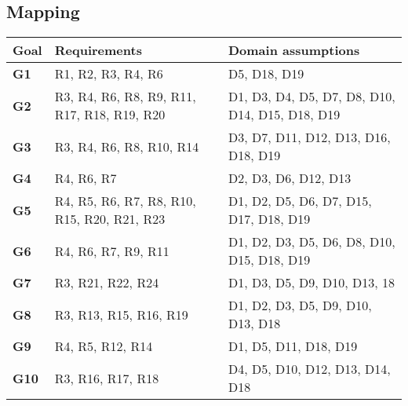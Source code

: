 \subsection{Mapping}
    \begin{center}
        {\renewcommand{\arraystretch}{2}
        \begin{longtable}{L{2cm}L{6cm}L{6cm}}
            \hline
            \textbf{Goal} & \textbf{Requirements} & \textbf{Domain assumptions} \\
            \hline
            \textbf{G1} & R1, R2, R3, R4, R6 & D5, D18, D19 \\
            \hline
            \textbf{G2} & R3, R4, R6, R8, R9, R11, R17, R18, R19, R20 & D1, D3, D4, D5, D7, D8, D10, D14, D15, D18, D19 \\
            \hline
            \textbf{G3} & R3, R4, R6, R8, R10, R14 & D3, D7, D11, D12, D13, D16, D18, D19 \\
            \hline
            \textbf{G4} & R4, R6, R7 & D2, D3, D6, D12, D13 \\
            \hline
            \textbf{G5} & R4, R5, R6, R7, R8, R10, R15, R20, R21, R23 & D1, D2, D5, D6, D7, D15, D17, D18, D19 \\
            \hline
            \textbf{G6} & R4, R6, R7, R9, R11 & D1, D2, D3, D5, D6, D8, D10, D15, D18, D19 \\
            \hline
            \textbf{G7} & R3, R21, R22, R24 & D1, D3, D5, D9, D10, D13, 18 \\
            \hline
            \textbf{G8} & R3, R13, R15, R16, R19 & D1, D2, D3, D5, D9, D10, D13, D18 \\
            \hline
            \textbf{G9} & R4, R5, R12, R14 & D1, D5, D11, D18, D19 \\
            \hline
            \textbf{G10} & R3, R16, R17, R18 & D4, D5, D10, D12, D13, D14, D18 \\
            \hline
        \end{longtable}}


\end{center}
